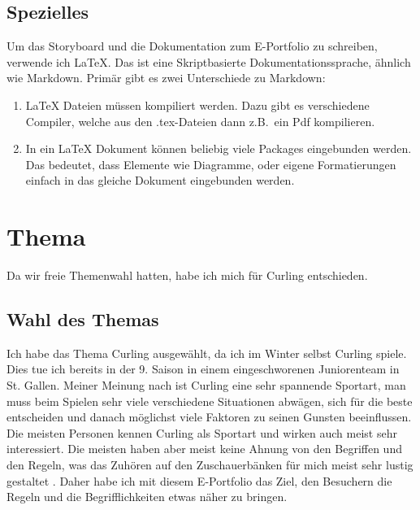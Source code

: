 \documentclass[11pt]{article}
\begin{document}
    \subsection{Spezielles}
    Um das Storyboard und die Dokumentation zum E-Portfolio zu schreiben, verwende ich \LaTeX. Das ist
    eine Skriptbasierte Dokumentationssprache, ähnlich wie Markdown. Primär gibt es zwei Unterschiede zu
    Markdown:
    \begin{enumerate}
        \item \LaTeX\xspace Dateien müssen kompiliert werden. Dazu gibt es verschiedene Compiler, welche aus den
        .tex-Dateien dann z.B.\ ein Pdf kompilieren.
        \item In ein \LaTeX\xspace Dokument können beliebig viele Packages eingebunden werden. Das bedeutet, dass
        Elemente wie Diagramme, oder eigene Formatierungen einfach in das gleiche Dokument eingebunden werden.
    \end{enumerate}

    \pagebreak
    \section{Thema}

    Da wir freie Themenwahl hatten, habe ich mich für Curling entschieden.

    \subsection{Wahl des Themas}

    Ich habe das Thema Curling ausgewählt, da ich im Winter selbst Curling spiele. Dies tue ich bereits in der
    9. Saison in einem eingeschworenen Juniorenteam in St. Gallen.
    Meiner Meinung nach ist Curling eine sehr spannende Sportart, man muss beim Spielen sehr viele verschiedene
    Situationen abwägen, sich für die beste entscheiden und danach möglichst viele Faktoren zu seinen Gunsten
    beeinflussen. \\
    Die meisten Personen kennen Curling als Sportart und wirken auch meist sehr interessiert. Die meisten haben
    aber meist keine Ahnung von den Begriffen und den Regeln, was das Zuhören auf den Zuschauerbänken für mich
    meist sehr lustig gestaltet \smiley. Daher habe ich mit diesem E-Portfolio das Ziel, den Besuchern
    die Regeln und die Begrifflichkeiten etwas näher zu bringen.
\end{document}
